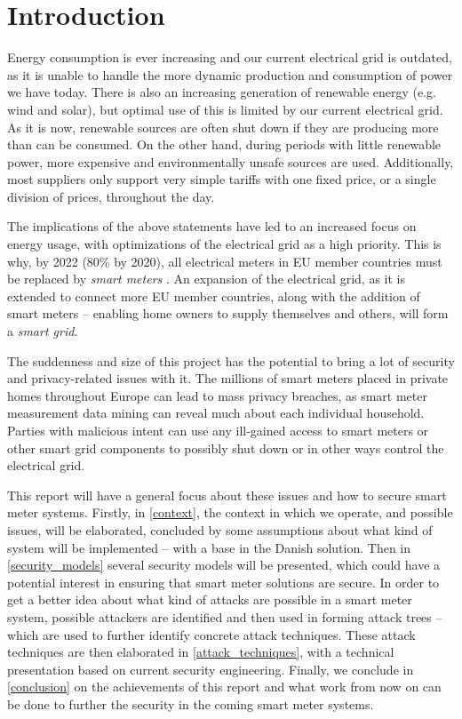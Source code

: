 
\chapter*{Introduction}

Energy consumption is ever increasing and our current electrical grid is outdated, as it is unable to handle the more dynamic production and consumption of power we have today.
There is also an increasing generation of renewable energy (e.g. wind and solar), but optimal use of this is limited by our current electrical grid.
As it is now, renewable sources are often shut down if they are producing more than can be consumed.
On the other hand, during periods with little renewable power, more expensive and environmentally unsafe sources are used.
Additionally, most suppliers only support very simple tariffs with one fixed price, or a single division of prices, throughout the day.

The implications of the above statements have led to an increased focus on energy usage, with optimizations of the electrical grid as a high priority.
This is why, by 2022 (80\% by 2020), all  electrical meters in EU member countries must be replaced by \emph{smart meters} \cite{smart_meter_survey, directive_2009_72_EC}.
An expansion of the electrical grid, as it is extended to connect more EU member countries, along with the addition of smart meters -- enabling home owners to supply themselves and others, will form a \emph{smart grid}.

The suddenness and size of this project has the potential to bring a lot of security and privacy-related issues with it.
The millions of smart meters placed in private homes throughout Europe can lead to mass privacy breaches, as smart meter measurement data mining can reveal much about each individual household.
Parties with malicious intent can use any ill-gained access to smart meters or other smart grid components to possibly shut down or in other ways control the electrical grid.

This report will have a general focus about these issues and how to secure smart meter systems.
Firstly, in \cref{context}, the context in which we operate, and possible issues, will be elaborated, concluded by some assumptions about what kind of system will be implemented -- with a base in the Danish solution.
Then in \cref{security_models} several security models will be presented, which could have a potential interest in ensuring that smart meter solutions are secure.
In order to get a better idea about what kind of attacks are possible in a smart meter system, possible attackers are identified and then used in forming attack trees -- which are used to further identify concrete attack techniques.
These attack techniques are then elaborated in \cref{attack_techniques}, with a technical presentation based on current security engineering.
Finally, we conclude in \cref{conclusion} on the achievements of this report and what work from now on can be done to further the security in the coming smart meter systems.
